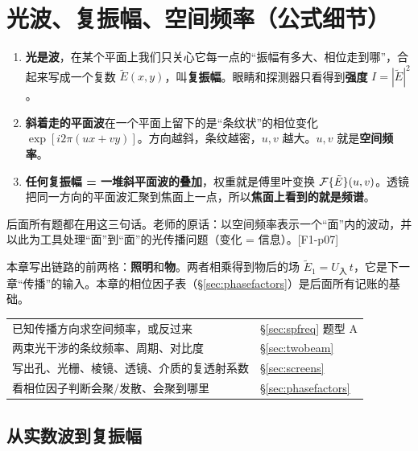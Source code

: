 \chapter{光波、复振幅、空间频率（公式细节）}\label{ch:wave}

\begin{idea}[先建立的三个图像]
\begin{enumerate}
\item \textbf{光是波}，在某个平面上我们只关心它每一点的“振幅有多大、相位走到哪”，合起来写成一个复数 $\tilde E(x,y)$，叫\textbf{复振幅}。眼睛和探测器只看得到\textbf{强度} $I=|\tilde E|^2$。
\item \textbf{斜着走的平面波}在一个平面上留下的是“条纹状”的相位变化 $\exp[i2\pi(ux+vy)]$。方向越斜，条纹越密，$u,v$ 越大。$u,v$ 就是\textbf{空间频率}。
\item \textbf{任何复振幅 = 一堆斜平面波的叠加}，权重就是傅里叶变换 $\mathcal{F}\{\tilde E\}(u,v)$。透镜把同一方向的平面波汇聚到焦面上一点，所以\textbf{焦面上看到的就是频谱}。
\end{enumerate}
后面所有题都在用这三句话。老师的原话：以空间频率表示一个“面”内的波动，并以此为工具处理“面”到“面”的光传播问题（变化 = 信息）。[F1-p07]
\end{idea}

\begin{idea}
本章写出链路的前两格：\textbf{照明}和\textbf{物}。两者相乘得到物后的场 $\tilde E_1=U_{\text{入}}\,t$，它是下一章“传播”的输入。本章的相位因子表（§\ref{sec:phasefactors}）是后面所有记账的基础。
\end{idea}

\begin{idea}[本章题型一览]
\begin{tabular}{@{}P{6.6cm}P{8.6cm}@{}}
已知传播方向求空间频率，或反过来 & §\ref{sec:spfreq} 题型 A\\
两束光干涉的条纹频率、周期、对比度 & §\ref{sec:twobeam}\\
写出孔、光栅、棱镜、透镜、介质的复透射系数 & §\ref{sec:screens}\\
看相位因子判断会聚/发散、会聚到哪里 & §\ref{sec:phasefactors}
\end{tabular}
\end{idea}

\section{从实数波到复振幅}

